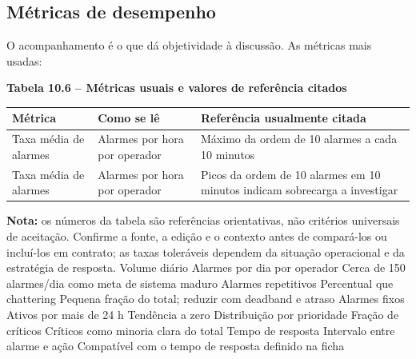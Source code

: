 \subsection{Métricas de desempenho}\label{muxe9tricas-de-desempenho}

O acompanhamento é o que dá objetividade à discussão. As métricas mais usadas:

\textbf{Tabela 10.6 -- Métricas usuais e valores de referência citados}

\begin{longtable}[]{@{}
  >{\raggedright\arraybackslash}p{}
  >{\raggedright\arraybackslash}p{}
  >{\raggedright\arraybackslash}p{}@{}}
\toprule\noalign{}
\begin{minipage}[b]{\linewidth}\raggedright
Métrica
\end{minipage} & \begin{minipage}[b]{\linewidth}\raggedright
Como se lê
\end{minipage} & \begin{minipage}[b]{\linewidth}\raggedright
Referência usualmente citada
\end{minipage} \\
\midrule\noalign{}
\endhead
\bottomrule\noalign{}
\endlastfoot
Taxa média de alarmes & Alarmes por hora por operador & Máximo da ordem de 10 alarmes a cada 10 minutos \\
Taxa média de alarmes & Alarmes por hora por operador & Picos da ordem de 10 alarmes em 10 minutos indicam sobrecarga a investigar \\
\end{longtable}

\textbf{Nota:} os números da tabela são referências orientativas, não critérios universais de aceitação. Confirme a fonte, a edição e o contexto antes de compará-los ou incluí-los em contrato; as taxas toleráveis dependem da situação operacional e da estratégia de resposta.
\textbar{} Volume diário \textbar{} Alarmes por dia por operador \textbar{} Cerca de 150 alarmes/dia como meta de sistema maduro \textbar{}
\textbar{} Alarmes repetitivos \textbar{} Percentual que chattering \textbar{} Pequena fração do total; reduzir com deadband e atraso \textbar{}
\textbar{} Alarmes fixos \textbar{} Ativos por mais de 24 h \textbar{} Tendência a zero \textbar{}
\textbar{} Distribuição por prioridade \textbar{} Fração de críticos \textbar{} Críticos como minoria clara do total \textbar{}
\textbar{} Tempo de resposta \textbar{} Intervalo entre alarme e ação \textbar{} Compatível com o tempo de resposta definido na ficha \textbar{}

